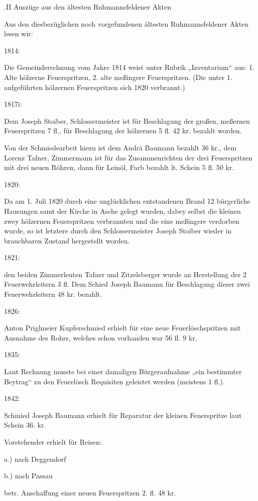 \documentclass{book}
\begin{document}
.II Auszüge aus den ältesten Ruhmannsfeldener Akten

Aus den diesbezüglichen noch vorgefundenen ältesten Ruhmannsfeldener Akten lesen
wir:

1814:

Die Gemeinderechnung vom Jahre 1814 weist unter Rubrik „Inventarium“ aus: 1.
Alte hölzerne Feuerspritzen, 2. alte meßingere Feuerspritzen. (Die unter 1.
aufgeführten hölzernen Feuerspritzen sich 1820 verbrannt.)

1817i:

Dem Joseph Stoiber, Schlossermeister ist für Beschlagung der großen, meßernen
Feuerspritzen 7 fl., für Beschlagung der hölzernen 5 fl. 42 kr. bezahlt worden.

Von der Schmiedearbeit hiezu ist dem Andrä Baumann bezahlt 36 kr., dem Lorenz
Tafner, Zimmermann ist für das Zusammenrichten der drei Feuerspritzen mit drei
neuen Röhren, dann für Leinöl, Farb bezahlt lt. Schein 5 fl. 50 kr.

1820:

Da am 1. Juli 1820 durch eine unglücklichen entstandenen Brand 12 bürgerliche
Hausungen samt der Kirche in Asche gelegt wurden, dabey selbst die kleinen zwey
hölzernen Feuerspritzen verbrannten und die eine meßingere verdorben wurde, so
ist letztere durch den Schlossermeister Joseph Stoiber wieder in brauchbaren
Zustand hergestellt worden.

1821:

den beiden Zimmerleuten Tafner und Zitzelsberger wurde an Herstellung der 2
Feuerwehrleitern 3 fl. Dem Schied Joseph Baumann für Beschlagung dieser zwei
Feuerwehrleitern 48 kr. bezahlt.

1826:

Anton Priglmeier Kupferschmied erhielt für eine neue Feuerlöschspritzen mit
Ausnahme des Rohrs, welches schon vorhanden war 56 fl. 9 kr.

1835:

Laut Rechnung musste bei einer damaligen Bürgeraufnahme „ein bestimmter Beytrag“
zu den Feuerlösch Requisiten geleistet werden (meistens 1 fl.).

1842:

Schmied Joseph Baumann erhielt für Reparatur der kleinen Feuerspritze laut
Schein 36. kr.

Vorstehender erhielt für Reisen:

a.) nach Deggendorf

b.) nach Passau

betr. Anschaffung einer neuen Feuerspritzen 2. fl. 48 kr.
\end{document}
